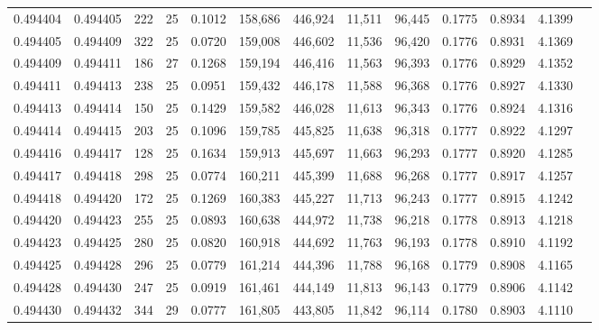 \begin{tabular}{rrrrrrrrrrrrr}
0.494404 & 0.494405 & 222 &  25 &                                     0.1012 & 158,686 & 446,924 &  11,511 &  96,445 & 0.1775 & 0.8934 & 4.1399 \\
0.494405 & 0.494409 & 322 &  25 &                                     0.0720 & 159,008 & 446,602 &  11,536 &  96,420 & 0.1776 & 0.8931 & 4.1369 \\
0.494409 & 0.494411 & 186 &  27 &                                     0.1268 & 159,194 & 446,416 &  11,563 &  96,393 & 0.1776 & 0.8929 & 4.1352 \\
0.494411 & 0.494413 & 238 &  25 &                                     0.0951 & 159,432 & 446,178 &  11,588 &  96,368 & 0.1776 & 0.8927 & 4.1330 \\
0.494413 & 0.494414 & 150 &  25 &                                     0.1429 & 159,582 & 446,028 &  11,613 &  96,343 & 0.1776 & 0.8924 & 4.1316 \\
0.494414 & 0.494415 & 203 &  25 &                                     0.1096 & 159,785 & 445,825 &  11,638 &  96,318 & 0.1777 & 0.8922 & 4.1297 \\
0.494416 & 0.494417 & 128 &  25 &                                     0.1634 & 159,913 & 445,697 &  11,663 &  96,293 & 0.1777 & 0.8920 & 4.1285 \\
0.494417 & 0.494418 & 298 &  25 &                                     0.0774 & 160,211 & 445,399 &  11,688 &  96,268 & 0.1777 & 0.8917 & 4.1257 \\
0.494418 & 0.494420 & 172 &  25 &                                     0.1269 & 160,383 & 445,227 &  11,713 &  96,243 & 0.1777 & 0.8915 & 4.1242 \\
0.494420 & 0.494423 & 255 &  25 &                                     0.0893 & 160,638 & 444,972 &  11,738 &  96,218 & 0.1778 & 0.8913 & 4.1218 \\
0.494423 & 0.494425 & 280 &  25 &                                     0.0820 & 160,918 & 444,692 &  11,763 &  96,193 & 0.1778 & 0.8910 & 4.1192 \\
0.494425 & 0.494428 & 296 &  25 &                                     0.0779 & 161,214 & 444,396 &  11,788 &  96,168 & 0.1779 & 0.8908 & 4.1165 \\
0.494428 & 0.494430 & 247 &  25 &                                     0.0919 & 161,461 & 444,149 &  11,813 &  96,143 & 0.1779 & 0.8906 & 4.1142 \\
0.494430 & 0.494432 & 344 &  29 &                                     0.0777 & 161,805 & 443,805 &  11,842 &  96,114 & 0.1780 & 0.8903 & 4.1110 \\

\end{tabular}

